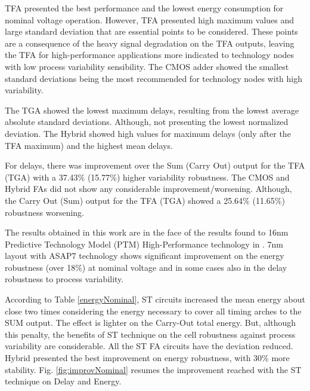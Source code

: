 \documentclass[ecp,tc, english]{iiufrgs}
\begin{document}
TFA presented the best performance and the lowest energy consumption for nominal voltage operation. However, TFA presented high maximum values and large standard deviation that are essential points to be considered. These points are a consequence of the heavy signal degradation on the TFA outputs, leaving the TFA for high-performance applications more indicated to technology nodes with low process variability sensibility. The CMOS adder showed the smallest standard deviations being the most recommended for technology nodes with high variability. 

The TGA showed the lowest maximum delays, resulting from the lowest average absolute standard deviations. Although, not presenting the lowest normalized deviation. The Hybrid showed high values for maximum delays (only after the TFA maximum) and the highest mean delays.   

For delays, there was improvement over the Sum (Carry Out) output for the TFA (TGA) with a 37.43\% (15.77\%) higher variability robustness. The CMOS and Hybrid FAs did not show any considerable improvement/worsening. Although, the Carry Out (Sum) output for the TFA (TGA) showed a 25.64\% (11.65\%) robustness worsening.

The results obtained in this work are in the face of the results found to 16nm Predictive Technology Model (PTM) High-Performance technology \cite{ptm} in \cite{samuel2016}. 7nm layout with ASAP7 technology shows significant improvement on the energy robustness (over 18\%) at nominal voltage and in some cases also in the delay robustness to process variability. 

According to Table \ref{energyNominal}, ST circuits increased the mean energy about close two times considering the energy necessary to cover all timing arches to the SUM output. The effect is lighter on the Carry-Out total energy. But, although this penalty, the benefits of ST technique on the cell robustness against process variability are considerable. All the ST FA circuits have the deviation reduced. Hybrid presented the best improvement on energy robustness, with 30\% more stability. Fig. \ref{fig:improvNominal} resumes the improvement reached with the ST technique on Delay and Energy.
\end{document}

